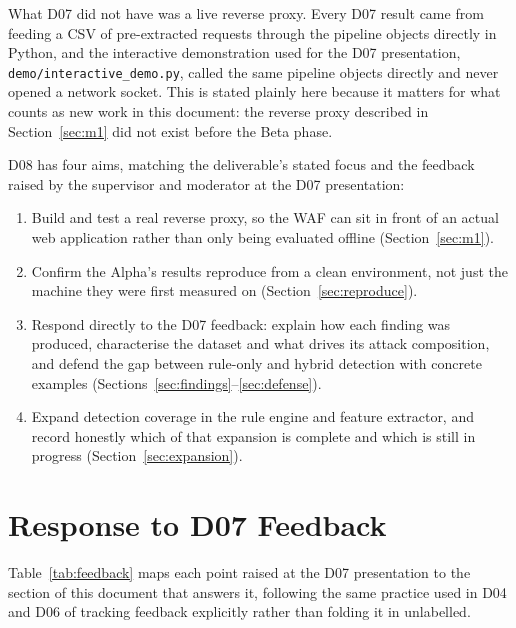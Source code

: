 \documentclass{llncs}
\begin{document}
What D07 did not have was a live reverse proxy. Every D07 result came
from feeding a CSV of pre-extracted requests through the pipeline objects
directly in Python, and the interactive demonstration used for the D07
presentation, \texttt{demo/interactive\_demo.py}, called the same pipeline
objects directly and never opened a network socket. This is stated plainly
here because it matters for what counts as new work in this document:
the reverse proxy described in Section~\ref{sec:m1} did not exist before
the Beta phase.

D08 has four aims, matching the deliverable's stated focus and the
feedback raised by the supervisor and moderator at the D07 presentation:

\begin{enumerate}
  \item Build and test a real reverse proxy, so the WAF can sit in front
        of an actual web application rather than only being evaluated
        offline (Section~\ref{sec:m1}).
  \item Confirm the Alpha's results reproduce from a clean environment,
        not just the machine they were first measured on
        (Section~\ref{sec:reproduce}).
  \item Respond directly to the D07 feedback: explain how each finding
        was produced, characterise the dataset and what drives its
        attack composition, and defend the gap between rule-only and
        hybrid detection with concrete examples
        (Sections~\ref{sec:findings}--\ref{sec:defense}).
  \item Expand detection coverage in the rule engine and feature
        extractor, and record honestly which of that expansion is
        complete and which is still in progress
        (Section~\ref{sec:expansion}).
\end{enumerate}

\clearpage
\section{Response to D07 Feedback}
\label{sec:feedback}

Table~\ref{tab:feedback} maps each point raised at the D07 presentation
to the section of this document that answers it, following the same
practice used in D04 and D06 of tracking feedback explicitly rather than
folding it in unlabelled.
\end{document}
